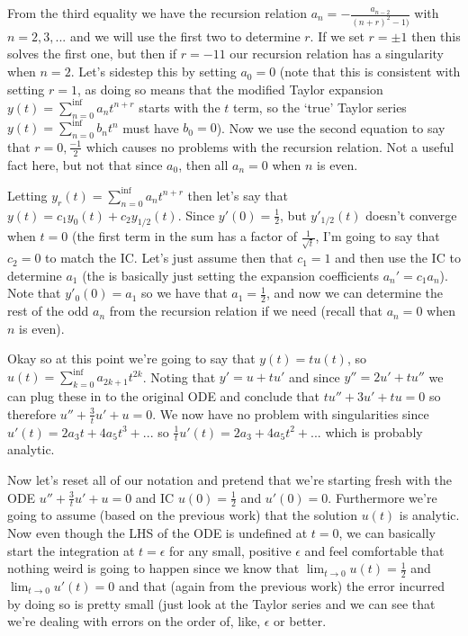 \documentclass[10pt,a4paper]{article}
\begin{document}
From the third equality we have the recursion relation $a_n = -\frac{a_{n-2}}{(n+r)^2-1)}$ with $n=2,3,...$ and we will use the first two to determine $r$.  If we set $r= \pm 1$ then this solves the first one, but then if $r=-11$ our recursion relation has a singularity when $n=2$.  Let's sidestep this by setting $a_0 = 0$ (note that this is consistent with setting $r=1$, as doing so means that the modified Taylor expansion $y(t) = \sum\limits_{n=0}^{\inf} a_n t^{n+r}$ starts with the $t$ term, so the `true' Taylor series $y(t) = \sum\limits_{n=0}^{\inf} b_n t^n$ must have $b_0 = 0$).  Now we use the second equation to say that $r=0,\frac{-1}{2}$ which causes no problems with the recursion relation.  Not a useful fact here, but not that since $a_0$, then all $a_n =0$ when $n$ is even.

Letting $y_r(t) = \sum\limits_{n=0}^{\inf} a_n t^{n+r}$ then let's say that $y(t) = c_1 y_0(t) + c_2 y_{1/2}(t)$.  Since $y'(0) = \frac{1}{2}$, but $y'_{1/2}(t)$ doesn't converge when $t=0$ (the first term in the sum has a factor of $\frac{1}{\sqrt{t}}$, I'm going to say that $c_2 =0$ to match the IC.  Let's just assume then that $c_1 = 1$ and then use the IC to determine $a_1$ (the is basically just setting the expansion coefficients $a_n' = c_1 a_n$).  Note that $y'_0(0) = a_1$ so we have that $a_1 = \frac{1}{2}$, and now we can determine the rest of the odd $a_n$ from the recursion relation if we need (recall that $a_n = 0$ when $n$ is even).

Okay so at this point we're going to say that $y(t) = t u(t)$, so $u(t) = \sum\limits_{k=0}^{\inf} a_{2k+1} t^{2k}$.  Noting that $y' = u + t u'$ and since $y'' = 2u' + t u''$ we can plug these in to the original ODE and conclude that $t u'' + 3u' + tu =0$ so therefore $u'' + \frac{3}{t}  u' + u = 0 $.  We now have no problem with singularities since $u'(t) = 2 a_3 t + 4 a_5 t^3 +...$ so $\frac{1}{t} u'(t)= 2 a_3 + 4 a_5 t^2 + ...$ which is probably analytic.

Now let's reset all of our notation and pretend that we're starting fresh with the ODE $u'' + \frac{3}{t}  u' + u = 0 $ and IC $u(0) = \frac{1}{2}$ and $u'(0) = 0$.  Furthermore we're going to assume (based on the previous work) that the solution $u(t)$ is analytic.  Now even though the LHS of the ODE is undefined at $t=0$, we can basically start the integration at $t = \epsilon$ for any small, positive $\epsilon$ and feel comfortable that nothing weird is going to happen since we know that $\lim_{t \rightarrow 0} u(t) = \frac{1}{2}$ and $\lim_{t \rightarrow 0} u'(t) = 0$ and that (again from the previous work) the error incurred by doing so is pretty small (just look at the Taylor series and we can see that we're dealing with errors on the order of, like, $\epsilon$ or better.
\end{document}
